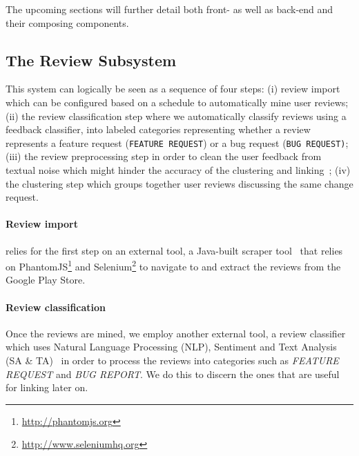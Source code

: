 
The upcoming sections will further detail both front- as well as back-end and their composing components.

%
%
\subsection{The Review Subsystem}


This system can logically be seen as a sequence of four steps: (i) review import which can be configured based on a schedule to automatically mine user reviews; (ii) the review classification step where we automatically classify reviews using a feedback classifier, into labeled categories representing whether a review represents a feature request (\texttt{FEATURE REQUEST}) or a bug request (\texttt{BUG REQUEST)}; (iii) the review preprocessing step in order to clean the user feedback from textual noise which might hinder the accuracy of the clustering and linking~\cite{Palomba2017}; (iv) the clustering step which groups together user reviews discussing the same change request.

\paragraph{Review import} 
\tool{} relies for the first step on an external tool, a Java-built scraper tool~\cite{Grano:2017} that relies on PhantomJS\footnote{\url{http://phantomjs.org}} and Selenium\footnote{\url{http://www.seleniumhq.org}} to navigate to and extract the reviews from the Google Play Store.

\paragraph{Review classification}
Once the reviews are mined, we employ another external tool, a review classifier~\cite{panichella2016ardoc} which uses Natural Language Processing (NLP), Sentiment and Text Analysis (SA \& TA)~\cite{panichella2016ardoc} in order to process the reviews into categories such as \textit{FEATURE REQUEST} and \textit{BUG REPORT}. We do this to discern the ones that are useful for linking later on.


